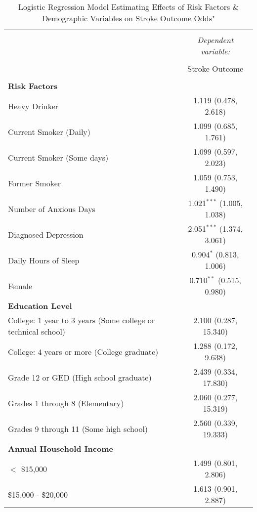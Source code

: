 \documentclass{article}
\newcommand\tab[1][3mm]{\hspace*{#1}}
\begin{document}
	\thispagestyle{empty}
\begin{table}[!htbp] \centering 
	\caption{Logistic Regression Model Estimating Effects of Risk Factors \& Demographic Variables on Stroke Outcome Odds"} 
	\label{} 
	\begin{tabular}{@{\extracolsep{5pt}}lc} 
		\\[-1.8ex]\hline 
		\hline \\[-1.8ex] 
		& \multicolumn{1}{c}{\textit{Dependent variable:}} \\ 
		\cline{2-2} 
		\\[-1.8ex] & Stroke Outcome \\ 
		\hline \\[-1.8ex]
		\textbf{Risk Factors} \\
		\tab Heavy Drinker & 1.119 (0.478, 2.618) \\ 
		\tab Current Smoker (Daily) & 1.099 (0.685, 1.761) \\ 
		\tab Current Smoker (Some days) & 1.099 (0.597, 2.023) \\ 
		\tab Former Smoker & 1.059 (0.753, 1.490) \\ 
		\tab Number of Anxious Days & 1.021$^{***}$ (1.005, 1.038) \\ 
		\tab Diagnosed Depression & 2.051$^{***}$ (1.374, 3.061) \\ 
		\tab Daily Hours of Sleep & 0.904$^{*}$ (0.813, 1.006) \\ 
		\tab Female & 0.710$^{**}$ (0.515, 0.980) \\ 
		\textbf{Education Level} \\
		\tab College: 1 year to 3 years (Some college or technical school) & 2.100 (0.287, 15.340) \\ 
		\tab College: 4 years or more (College graduate) & 1.288 (0.172, 9.638) \\ 
		\tab Grade 12 or GED (High school graduate)  & 2.439 (0.334, 17.830) \\ 
		\tab Grades 1 through 8 (Elementary)  & 2.060 (0.277, 15.319) \\ 
		\tab Grades 9 through 11 (Some high school)  & 2.560 (0.339, 19.333) \\
		\textbf{Annual Household Income} \\
		\tab $<$ \$15,000 & 1.499 (0.801, 2.806) \\ 
		\tab \$15,000 - \$20,000 & 1.613 (0.901, 2.887) \\ 

\end{tabular}
\end{table}
\end{document}
